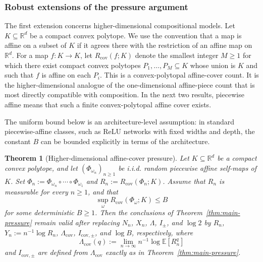 \documentclass[11pt]{amsart}
\numberwithin{equation}{section}
\theoremstyle{plain}
\newtheorem{theorem}{Theorem}[section]
\theoremstyle{definition}
\theoremstyle{remark}
\begin{document}
\subsubsection{Robust extensions of the pressure argument}

The first extension concerns higher-dimensional compositional models. Let \(K\subseteq\mathbb R^d\) be a compact convex polytope. We use the convention that a map is affine on a subset of \(K\) if it agrees there with the restriction of an affine map on \(\mathbb R^d\). For a map \(f:K\to K\), let \(R_{\mathrm{cov}}(f;K)\) denote the smallest integer \(M\ge1\) for which there exist compact convex polytopes \(P_1,\dots,P_M\subseteq K\) whose union is \(K\) and such that \(f\) is affine on each \(P_i\). This is a convex-polytopal affine-cover count. It is the higher-dimensional analogue of the one-dimensional affine-piece count that is most directly compatible with composition. In the next two results, piecewise affine means that such a finite convex-polytopal affine cover exists.

The uniform bound below is an architecture-level assumption: in standard
piecewise-affine classes, such as ReLU networks with fixed widths and depth,
the constant \(B\) can be bounded explicitly in terms of the architecture.


\begin{theorem}[Higher-dimensional affine-cover pressure]\label{thm:main-polyhedral-pressure}
Let \(K\subseteq\mathbb R^d\) be a compact convex polytope, and let \((\Phi_{\omega_n})_{n\ge1}\) be i.i.d. random piecewise affine self-maps of \(K\). Set \(\Phi_n:=\Phi_{\omega_n}\circ\cdots\circ\Phi_{\omega_1}\) and \(R_n:=R_{\mathrm{cov}}(\Phi_n;K)\). Assume that \(R_n\) is measurable for every \(n\ge1\), and that 
\[\sup_{\omega}R_{\mathrm{cov}}(\Phi_{\omega};K)\le B\] 
for some deterministic \(B\ge1\). Then the conclusions of Theorem~\ref{thm:main-pressure} remain valid after replacing \(N_n\), \(X_n\), \(\Lambda\), \(I_\pm\), and \(\log 2\) by \(R_n\), \(Y_n:=n^{-1}\log R_n\), \(\Lambda_{\mathrm{cov}}\), \(I_{\mathrm{cov},\pm}\), and \(\log B\), respectively, where
\[
\Lambda_{\mathrm{cov}}(q):=\lim_{n\to\infty} n^{-1}\log\mathbb E[R_n^q]
\]
and \(I_{\mathrm{cov},\pm}\) are defined from \(\Lambda_{\mathrm{cov}}\) exactly as in Theorem~\ref{thm:main-pressure}.
\end{theorem}
\end{document}

